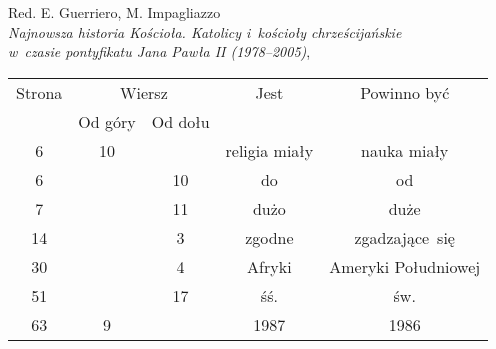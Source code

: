 \documentclass[a4paper,11pt]{article}
\begin{document}
{ %
  Red. E. Guerriero, M. Impagliazzo \\
  \textit{Najnowsza historia Kościoła. Katolicy i~kościoły
    chrześcijańskie} \\
  \textit{w~czasie pontyfikatu Jana Pawła II (1978--2005)},
  \cite{GuerrieroImpagliazzoNajnowszaHistoriaKosciola2006} }

\vspace{0em}




\begin{center}

  \begin{tabular}{|c|c|c|c|c|}
    \hline
    Strona & \multicolumn{2}{c|}{Wiersz} & Jest
                              & Powinno być \\ \cline{2-3}
    & Od góry & Od dołu & & \\
    \hline
    \hphantom{0}6 & 10 & & religia miały & nauka miały \\
    \hphantom{0}6 & & 10 & do & od \\
    \hphantom{0}7 & & 11 & dużo & duże \\
    14 & & \hphantom{0}3 & zgodne & zgadzające~się \\
    30 & & \hphantom{0}4 & Afryki & Ameryki Południowej \\
    51 & & 17 & śś. & św. \\
    63 & \hphantom{0}9 & & 1987 & 1986 \\
    \hline
  \end{tabular}

\end{center}














\end{document}
